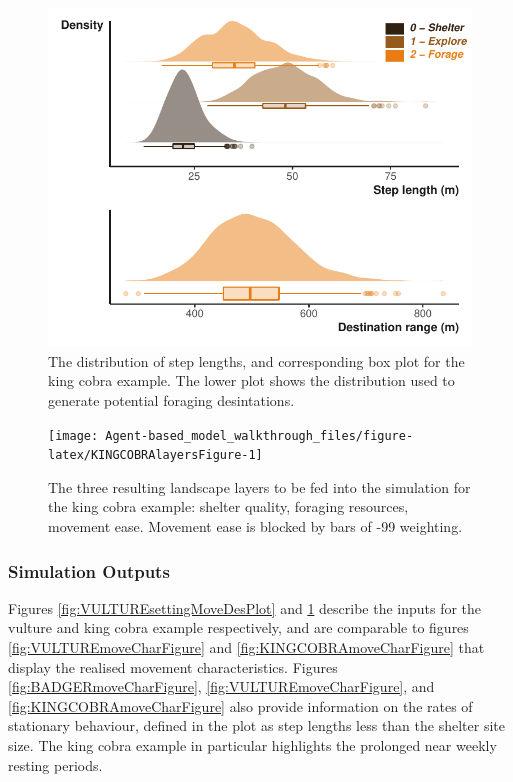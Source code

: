 \documentclass[10pt,a4paper]{article}
\begin{document}
\begin{figure}

{\centering \includegraphics{Agent-based_model_walkthrough_files/figure-latex/KINGCOBRAsettingMoveDesPlot-1} 

}

\caption{The distribution of step lengths, and corresponding box plot for the king cobra example. The lower plot shows the distribution used to generate potential foraging desintations.}\label{fig:KINGCOBRAsettingMoveDesPlot}
\end{figure}

\begin{figure}

{\centering \texttt{[image: Agent-based\_model\_walkthrough\_files/figure-latex/KINGCOBRAlayersFigure-1]} 

}

\caption{The three resulting landscape layers to be fed into the simulation for the king cobra example: shelter quality, foraging resources, movement ease. Movement ease is blocked by bars of -99 weighting.}\label{fig:KINGCOBRAlayersFigure}
\end{figure}

\hypertarget{simulation-outputs}{%
\subsubsection{Simulation Outputs}\label{simulation-outputs}}

Figures \ref{fig:VULTUREsettingMoveDesPlot} and \ref{fig:KINGCOBRAsettingMoveDesPlot} describe the inputs for the vulture and king cobra example respectively, and are comparable to figures \ref{fig:VULTUREmoveCharFigure} and \ref{fig:KINGCOBRAmoveCharFigure} that display the realised movement characteristics.
Figures \ref{fig:BADGERmoveCharFigure}, \ref{fig:VULTUREmoveCharFigure}, and \ref{fig:KINGCOBRAmoveCharFigure} also provide information on the rates of stationary behaviour, defined in the plot as step lengths less than the shelter site size.
The king cobra example in particular highlights the prolonged near weekly resting periods.
\end{document}
